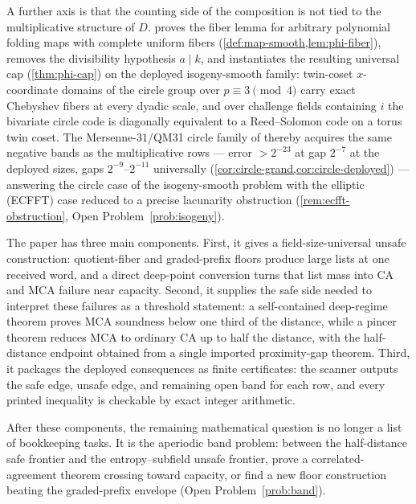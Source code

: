 \documentclass[11pt]{article}
\theoremstyle{definition}
\theoremstyle{remark}
\begin{document}
A further axis is that the counting side of the composition is not tied to the multiplicative structure of $D$.  proves the fiber lemma for arbitrary polynomial folding maps with complete uniform fibers (\cref{def:map-smooth,lem:phi-fiber}), removes the divisibility hypothesis $a\mid k$, and instantiates the resulting universal cap (\cref{thm:phi-cap}) on the deployed isogeny-smooth family: twin-coset $x$-coordinate domains of the circle group over $p\equiv3\pmod4$ carry exact Chebyshev fibers at every dyadic scale, and over challenge fields containing $i$ the bivariate circle code is diagonally equivalent to a Reed--Solomon code on a torus twin coset. The Mersenne-$31$/QM31 circle family of \cite{HLP24} thereby acquires the same negative bands as the multiplicative rows --- error $>2^{-23}$ at gap $2^{-7}$ at the deployed sizes, gaps $2^{-9}$--$2^{-11}$ universally (\cref{cor:circle-grand,cor:circle-deployed}) --- answering the circle case of the isogeny-smooth problem with the elliptic (ECFFT) case reduced to a precise lacunarity obstruction (\cref{rem:ecfft-obstruction}, Open Problem~\ref{prob:isogeny}).

The paper has three main components.  First, it gives a field-size-universal unsafe construction: quotient-fiber and graded-prefix floors produce large lists at one received word, and a direct deep-point conversion turns that list mass into CA and MCA failure near capacity.  Second, it supplies the safe side needed to interpret these failures as a threshold statement: a self-contained deep-regime theorem proves MCA soundness below one third of the distance, while a pincer theorem reduces MCA to ordinary CA up to half the distance, with the half-distance endpoint obtained from a single imported proximity-gap theorem.  Third, it packages the deployed consequences as finite certificates: the scanner outputs the safe edge, unsafe edge, and remaining open band for each row, and every printed inequality is checkable by exact integer arithmetic.

After these components, the remaining mathematical question is no longer a list of bookkeeping tasks.  It is the aperiodic band problem: between the half-distance safe frontier and the entropy--subfield unsafe frontier, prove a correlated-agreement theorem crossing toward capacity, or find a new floor construction beating the graded-prefix envelope (Open Problem~\ref{prob:band}).
\end{document}

